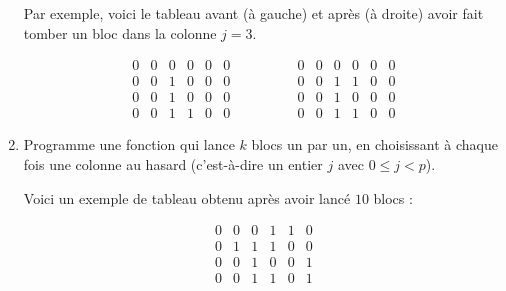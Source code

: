 \documentclass[11pt,class=report,crop=false]{standalone}
\begin{document}
\begin{activite}
\begin{enumerate}
  Par exemple, voici le tableau avant (à gauche) et après (à droite) avoir fait tomber un bloc dans la colonne $j=3$.  
  
$$\begin{array}{cccccc}
0&0&0&0&0&0\\
0&0&1&0&0&0\\
0&0&1&0&0&0\\
0&0&1&1&0&0
\end{array}\qquad\qquad
\begin{array}{cccccc}
0&0&0&0&0&0\\
0&0&1&1&0&0\\
0&0&1&0&0&0\\
0&0&1&1&0&0
\end{array}
$$
 

 
  \item Programme une fonction  qui lance 
  $k$ blocs un par un, en choisissant à chaque fois une colonne au hasard (c'est-à-dire un entier $j$ avec $0 \le j < p$). 
  
  Voici un exemple de tableau obtenu après avoir lancé $10$ blocs :
  
 
\begin{center}
\begin{minipage}{0.3\textwidth} 
 $$\begin{array}{cccccc} 
0&0&0&1&1&0\\
0&1&1&1&0&0\\
0&0&1&0&0&1\\
0&0&1&1&0&1
\end{array}
$$
\end{minipage}
\begin{minipage}{0.4\textwidth} 
\end{minipage}
\end{center}  

\end{enumerate}

\end{activite}


\end{document}
